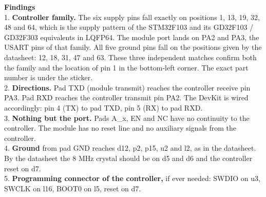 \documentclass[10pt]{article}
\begin{document}
\vspace{10pt}
\textbf{Findings}\\[3pt]
1. \textbf{Controller family.} The six supply pins fall exactly on positions 1, 13, 19, 32, 48 and 64, which is the supply pattern of the STM32F103 and its GD32F103 / GD32F303 equivalents in LQFP64. The module port lands on PA2 and PA3, the USART pins of that family. All five ground pins fall on the positions given by the datasheet: 12, 18, 31, 47 and 63. These three independent matches confirm both the family and the location of pin 1 in the bottom-left corner. The exact part number is under the sticker.\\[2pt]
2. \textbf{Directions.} Pad TXD (module transmit) reaches the controller receive pin PA3. Pad RXD reaches the controller transmit pin PA2. The DevKit is wired accordingly: pin 4 (TX) to pad TXD, pin 5 (RX) to pad RXD.\\[2pt]
3. \textbf{Nothing but the port.} Pads A\_x, EN and NC have no continuity to the controller. The module has no reset line and no auxiliary signals from the controller.\\[2pt]
4. \textbf{Ground} from pad GND reaches d12, p2, p15, u2 and l2, as in the datasheet. By the datasheet the 8 MHz crystal should be on d5 and d6 and the controller reset on d7.\\[2pt]
5. \textbf{Programming connector of the controller,} if ever needed: SWDIO on u3, SWCLK on l16, BOOT0 on l5, reset on d7.
\end{document}
